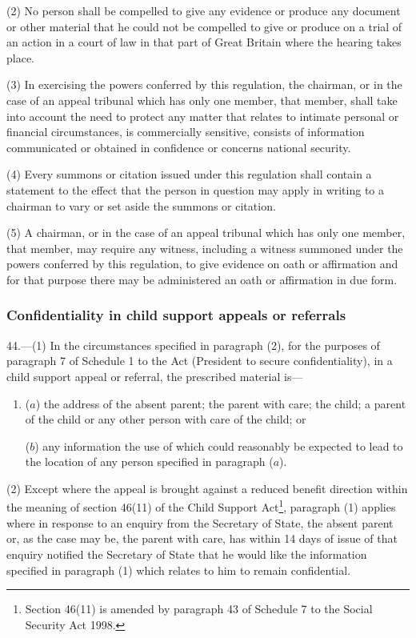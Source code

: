 \documentclass[12pt,a4paper]{article}
\begin{document}
(2) No person shall be compelled to give any evidence or produce any document or other material that he could not be compelled to give or produce on a trial of an action in a court of law in that part of Great Britain where the hearing takes place.

(3) In exercising the powers conferred by this regulation, the chairman, or in the case of an appeal tribunal which has only one member, that member, shall take into account the need to protect any matter that relates to intimate personal or financial circumstances, is commercially sensitive, consists of information communicated or obtained in confidence or concerns national security.

(4) Every summons or citation issued under this regulation shall contain a statement to the effect that the person in question may apply in writing to a chairman to vary or set aside the summons or citation.

(5) A chairman, or in the case of an appeal tribunal which has only one member, that member, may require any witness, including a witness summoned under the powers conferred by this regulation, to give evidence on oath or affirmation and for that purpose there may be administered an oath or affirmation in due form.

\subsubsection[44. Confidentiality in child support appeals or referrals]{Confidentiality in child support appeals or referrals}

44.—(1) In the circumstances specified in paragraph (2), for the purposes of paragraph 7 of Schedule 1 to the Act (President to secure confidentiality), in a child support appeal or referral, the prescribed material is—
\begin{enumerate}\item[]
($a$) the address of the absent parent; the parent with care; the child; a parent of the child or any other person with care of the child; or

($b$) any information the use of which could reasonably be expected to lead to the location of any person specified in paragraph ($a$).
\end{enumerate}

(2) Except where the appeal is brought against a reduced benefit direction within the meaning of section 46(11) of the Child Support Act\footnote{\frenchspacing Section 46(11) is amended by paragraph 43 of Schedule 7 to the Social Security Act 1998.}, paragraph (1) applies where in response to an enquiry from the Secretary of State, the absent parent or, as the case may be, the parent with care, has within 14 days of issue of that enquiry notified the Secretary of State that he would like the information specified in paragraph (1) which relates to him to remain confidential.
\end{document}
